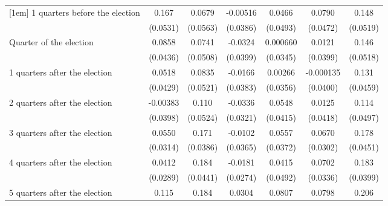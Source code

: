 \begin{table}[htbp]
\begin{tabular}{l*{6}{c}}
[1em]
 1 quarters before the election&       0.167\sym{**} &      0.0679         &    -0.00516         &      0.0466         &      0.0790         &       0.148\sym{**} \\
                    &    (0.0531)         &    (0.0563)         &    (0.0386)         &    (0.0493)         &    (0.0472)         &    (0.0519)         \\
[1em]
Quarter of the election&      0.0858\sym{*}  &      0.0741         &     -0.0324         &    0.000660         &      0.0121         &       0.146\sym{**} \\
                    &    (0.0436)         &    (0.0508)         &    (0.0399)         &    (0.0345)         &    (0.0399)         &    (0.0518)         \\
[1em]
 1 quarters after the election&      0.0518         &      0.0835         &     -0.0166         &     0.00266         &   -0.000135         &       0.131\sym{**} \\
                    &    (0.0429)         &    (0.0521)         &    (0.0383)         &    (0.0356)         &    (0.0400)         &    (0.0459)         \\
[1em]
 2 quarters after the election&    -0.00383         &       0.110\sym{*}  &     -0.0336         &      0.0548         &      0.0125         &       0.114\sym{*}  \\
                    &    (0.0398)         &    (0.0524)         &    (0.0321)         &    (0.0415)         &    (0.0418)         &    (0.0497)         \\
[1em]
 3 quarters after the election&      0.0550         &       0.171\sym{***}&     -0.0102         &      0.0557         &      0.0670\sym{*}  &       0.178\sym{***}\\
                    &    (0.0314)         &    (0.0386)         &    (0.0365)         &    (0.0372)         &    (0.0302)         &    (0.0451)         \\
[1em]
 4 quarters after the election&      0.0412         &       0.184\sym{***}&     -0.0181         &      0.0415         &      0.0702\sym{*}  &       0.183\sym{***}\\
                    &    (0.0289)         &    (0.0441)         &    (0.0274)         &    (0.0492)         &    (0.0336)         &    (0.0399)         \\
[1em]
 5 quarters after the election&       0.115\sym{**} &       0.184\sym{***}&      0.0304         &      0.0807\sym{*}  &      0.0798\sym{*}  &       0.206\sym{***}\\

\end{tabular}
\end{table}
